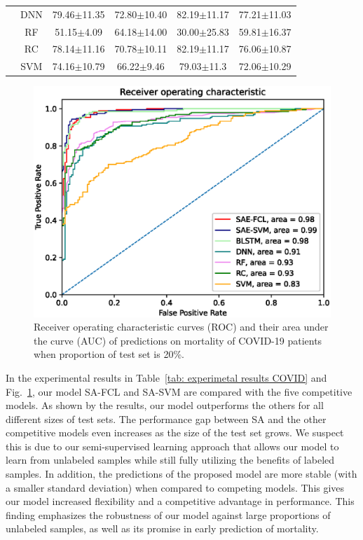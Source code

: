\begin{table}[h]
\begin{tabular}{c c cccc}
    & DNN & \multicolumn{1}{c}{79.46$\pm$11.35} & \multicolumn{1}{c}{72.80$\pm$10.40} & \multicolumn{1}{c}{82.19$\pm$11.17} & 77.21$\pm$11.03\\
    & RF & \multicolumn{1}{c}{51.15$\pm$4.09} & \multicolumn{1}{c}{64.18$\pm$14.00} & \multicolumn{1}{c}{30.00$\pm$25.83} & 59.81$\pm$16.37\\
    & RC & \multicolumn{1}{c}{78.14$\pm$11.16} & \multicolumn{1}{c}{70.78$\pm$10.11} & \multicolumn{1}{c}{82.19$\pm$11.17} & 76.06$\pm$10.87\\
    & SVM & \multicolumn{1}{c}{74.16$\pm$10.79} & \multicolumn{1}{c}{66.22$\pm$9.46} & \multicolumn{1}{c}{79.03$\pm$11.3} & 72.06$\pm$10.29\\
        \bottomrule
    \end{tabular}
\end{table}

\begin{figure}[h]
    \includegraphics[width=1.0\linewidth]{figures/larger/roc_curve-covid-larger.eps}
    \caption{Receiver operating characteristic curves (ROC) and their area under the curve (AUC) of predictions on mortality of COVID-19 patients when proportion of test set is 20\%.} \label{fig: roc_curve COVID}
\end{figure}

In the experimental results in Table~\ref{tab: experimetal results COVID} and Fig.~\ref{fig: roc_curve COVID}, our model SA-FCL and SA-SVM are compared with the five competitive models. As shown by the results, our model outperforms the others for all different sizes of test sets. The performance gap between SA and the other competitive models even increases as the size of the test set grows. We suspect this is due to our semi-supervised learning approach that allows our model to learn from unlabeled samples while still fully utilizing the benefits of labeled samples. In addition, the predictions of the proposed model are more stable (with a smaller standard deviation) when compared to competing models. This gives our model increased flexibility and a competitive advantage in performance. This finding emphasizes the robustness of our model against large proportions of unlabeled samples, as well as its promise in early prediction of mortality.

